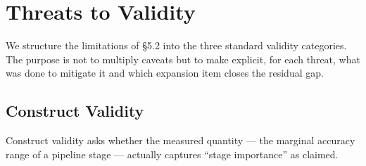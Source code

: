 %

\section{Threats to Validity}
\label{sec:threats}

We structure the limitations of \S5.2 into the three
standard validity categories. The purpose is not to multiply caveats but to
make explicit, for each threat, what was done to mitigate it and which
expansion item closes the residual gap.

\subsection{Construct Validity}
\label{sec:threats_construct}

Construct validity asks whether the measured quantity --- the marginal
accuracy range of a pipeline stage --- actually captures ``stage importance''
as claimed.

